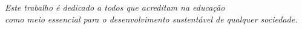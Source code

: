 \begin{dedicatoria}
   \vspace*{\fill}
   \centering
   \noindent
   \textit{Este trabalho é dedicado a todos que acreditam na educação\\
   como meio essencial para o desenvolvimento sustentável de qualquer sociedade.} \vspace*{\fill}
\end{dedicatoria}
